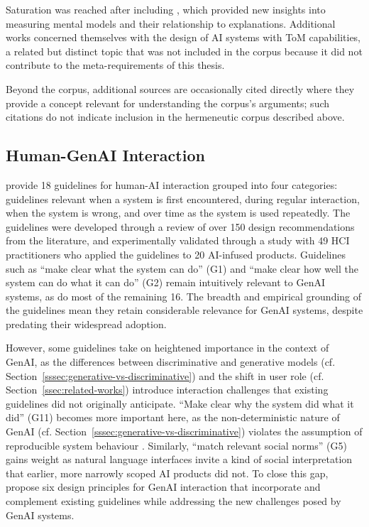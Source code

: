 Saturation was reached after including \textcite{Hoffman2023}, which provided new insights into measuring mental models and their relationship to explanations. Additional works \parencite[e.g.,][]{Baker2017} concerned themselves with the design of \ac{AI} systems with \ac{ToM} capabilities, a related but distinct topic that was not included in the corpus because it did not contribute to the meta-requirements of this thesis.

Beyond the corpus, additional sources are occasionally cited directly where they provide a concept relevant for understanding the corpus's arguments; such citations do not indicate inclusion in the hermeneutic corpus described above.

\subsection{Human-GenAI Interaction} \label{ssec:hai-genai}

\textcite{Amershi2019} provide 18 guidelines for human-AI interaction grouped into four categories: guidelines relevant when a system is first encountered, during regular interaction, when the system is wrong, and over time as the system is used repeatedly. The guidelines were developed through a review of over 150 design recommendations from the literature, and experimentally validated through a study with 49 \ac{HCI} practitioners who applied the guidelines to 20 AI-infused products. Guidelines such as \enquote{make clear what the system can do} (G1) and \enquote{make clear how well the system can do what it can do} (G2) \parencite{Amershi2019} remain intuitively relevant to \ac{GenAI} systems, as do most of the remaining 16. The breadth and empirical grounding of the guidelines mean they retain considerable relevance for \ac{GenAI} systems, despite predating their widespread adoption.

However, some guidelines take on heightened importance in the context of \ac{GenAI}, as the differences between discriminative and generative models (cf. Section~\ref{sssec:generative-vs-discriminative}) and the shift in user role (cf. Section~\ref{ssec:related-works}) introduce interaction challenges that existing guidelines did not originally anticipate. \enquote{Make clear why the system did what it did} (G11) \parencite{Amershi2019} becomes more important here, as the non-deterministic nature of \ac{GenAI} (cf. Section~\ref{sssec:generative-vs-discriminative}) violates the assumption of reproducible system behaviour \parencite{Weisz2025}. Similarly, \enquote{match relevant social norms} (G5) \parencite{Amershi2019} gains weight as natural language interfaces invite a kind of social interpretation that earlier, more narrowly scoped \ac{AI} products did not. To close this gap, \textcite{Weisz2025} propose six design principles for \ac{GenAI} interaction that incorporate and complement existing guidelines while addressing the new challenges posed by \ac{GenAI} systems.

